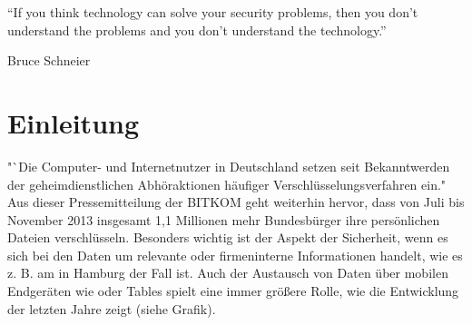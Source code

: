 \documentclass[10pt, a4paper,headsepline,pointednumbers]{scrreprt}
\begin{document}
\pagestyle{empty}




\vspace*{\fill}
\begin{center}
“If you think technology can solve your security problems, then you don’t understand the problems and you don’t understand the technology.”
\end{center}
\begin{flushright}
Bruce Schneier
\end{flushright}
\vspace*{\fill}

\clearpage%
\begingroup
  \renewcommand*{\chapterpagestyle}{empty}
  \pagestyle{empty}
  \tableofcontents
  \listoffigures
  \clearpage
\endgroup


\fancyhead[L]{\nouppercase{\leftmark}} %

\chapter{Einleitung}
\setcounter{page}{1}
\pagestyle{fancy}
"`Die Computer- und Internetnutzer in Deutschland setzen seit Bekanntwerden der geheimdienstlichen Abhöraktionen häufiger Verschlüsselungsverfahren ein." \cite{website:bitkom-verschl} 
Aus dieser Pressemitteilung der BITKOM geht weiterhin hervor, dass von Juli bis November 2013 insgesamt 1,1 Millionen mehr Bundesbürger ihre persönlichen Dateien verschlüsseln. Besonders wichtig ist der Aspekt der Sicherheit, wenn es sich bei den Daten um relevante oder firmeninterne Informationen handelt, wie es z. B. am  in Hamburg der Fall ist. Auch der Austausch von Daten über mobilen Endgeräten wie  oder Tables spielt eine immer größere Rolle, wie die Entwicklung der letzten Jahre zeigt (siehe Grafik). \\
\end{document}
